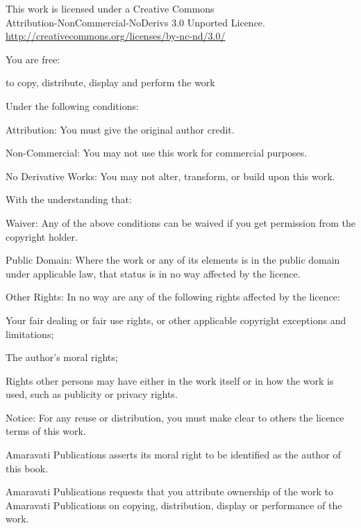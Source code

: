 \thispagestyle{plain}

\vspace*{-2\onelineskip}
\enlargethispage{\onelineskip}

{\smaller\setlength{\parindent}{0pt}%
\raggedright\label{copyright-details}
\setlength{\parskip}{5pt}
{\centering

{\large\ccbyncnd}

This work is licensed under a Creative Commons\\
Attribution-NonCommercial-NoDerivs 3.0 Unported Licence.\\
\href{http://creativecommons.org/licenses/by-nc-nd/3.0/}{http://creativecommons.org/licenses/by-nc-nd/3.0/}

}

You are free:

\begin{packeditemize}
\item to copy, distribute, display and perform the work
\end{packeditemize}

Under the following conditions:

\begin{packeditemize}
\item Attribution: You must give the original author credit.
\item Non-Commercial: You may not use this work for commercial purposes.
\item No Derivative Works: You may not alter, transform, or build upon this work.
\end{packeditemize}

With the understanding that:

\begin{packeditemize}
\item Waiver: Any of the above conditions can be waived if you get permission from the copyright holder.
\item Public Domain: Where the work or any of its elements is in the public domain under applicable law, that status is in no way affected by the licence.
\item Other Rights: In no way are any of the following rights affected by the licence:
\begin{packeditemize}
\item Your fair dealing or fair use rights, or other applicable copyright exceptions and limitations;
\item The author's moral rights;
\item Rights other persons may have either in the work itself or in how the work is used, such as publicity or privacy rights.
\end{packeditemize}
\item Notice: For any reuse or distribution, you must make clear to others the licence terms of this work.
\end{packeditemize}

Amaravati Publications asserts its moral right to be identified as the
author of this book.

Amaravati Publications requests that you attribute ownership of the work
to Amaravati Publications on copying, distribution, display or
performance of the work.

}

